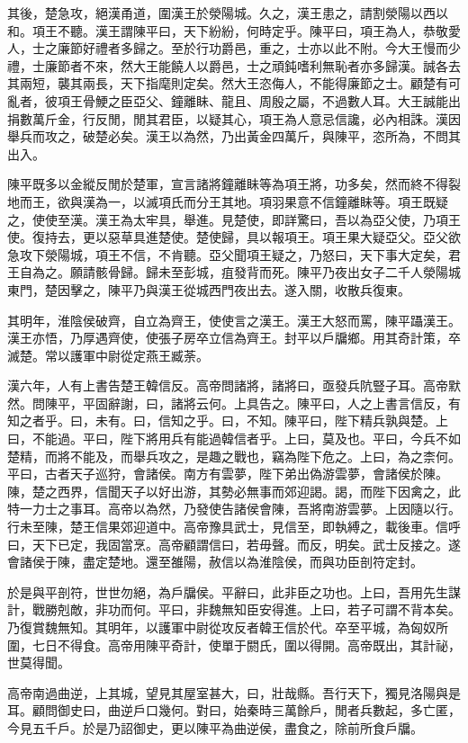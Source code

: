 其後，楚急攻，絕漢甬道，圍漢王於滎陽城。久之，漢王患之，請割滎陽以西以和。項王不聽。漢王謂陳平曰，天下紛紛，何時定乎。陳平曰，項王為人，恭敬愛人，士之廉節好禮者多歸之。至於行功爵邑，重之，士亦以此不附。今大王慢而少禮，士廉節者不來，然大王能饒人以爵邑，士之頑鈍嗜利無恥者亦多歸漢。誠各去其兩短，襲其兩長，天下指麾則定矣。然大王恣侮人，不能得廉節之士。顧楚有可亂者，彼項王骨鯁之臣亞父、鐘離眛、龍且、周殷之屬，不過數人耳。大王誠能出捐數萬斤金，行反閒，閒其君臣，以疑其心，項王為人意忌信讒，必內相誅。漢因舉兵而攻之，破楚必矣。漢王以為然，乃出黃金四萬斤，與陳平，恣所為，不問其出入。

陳平既多以金縱反閒於楚軍，宣言諸將鐘離眛等為項王將，功多矣，然而終不得裂地而王，欲與漢為一，以滅項氏而分王其地。項羽果意不信鐘離眛等。項王既疑之，使使至漢。漢王為太牢具，舉進。見楚使，即詳驚曰，吾以為亞父使，乃項王使。復持去，更以惡草具進楚使。楚使歸，具以報項王。項王果大疑亞父。亞父欲急攻下滎陽城，項王不信，不肯聽。亞父聞項王疑之，乃怒曰，天下事大定矣，君王自為之。願請骸骨歸。歸未至彭城，疽發背而死。陳平乃夜出女子二千人滎陽城東門，楚因擊之，陳平乃與漢王從城西門夜出去。遂入關，收散兵復東。

其明年，淮陰侯破齊，自立為齊王，使使言之漢王。漢王大怒而罵，陳平躡漢王。漢王亦悟，乃厚遇齊使，使張子房卒立信為齊王。封平以戶牖鄉。用其奇計策，卒滅楚。常以護軍中尉從定燕王臧荼。

漢六年，人有上書告楚王韓信反。高帝問諸將，諸將曰，亟發兵阬豎子耳。高帝默然。問陳平，平固辭謝，曰，諸將云何。上具告之。陳平曰，人之上書言信反，有知之者乎。曰，未有。曰，信知之乎。曰，不知。陳平曰，陛下精兵孰與楚。上曰，不能過。平曰，陛下將用兵有能過韓信者乎。上曰，莫及也。平曰，今兵不如楚精，而將不能及，而舉兵攻之，是趣之戰也，竊為陛下危之。上曰，為之柰何。平曰，古者天子巡狩，會諸侯。南方有雲夢，陛下弟出偽游雲夢，會諸侯於陳。陳，楚之西界，信聞天子以好出游，其勢必無事而郊迎謁。謁，而陛下因禽之，此特一力士之事耳。高帝以為然，乃發使告諸侯會陳，吾將南游雲夢。上因隨以行。行未至陳，楚王信果郊迎道中。高帝豫具武士，見信至，即執縛之，載後車。信呼曰，天下已定，我固當烹。高帝顧謂信曰，若毋聲。而反，明矣。武士反接之。遂會諸侯于陳，盡定楚地。還至雒陽，赦信以為淮陰侯，而與功臣剖符定封。

於是與平剖符，世世勿絕，為戶牖侯。平辭曰，此非臣之功也。上曰，吾用先生謀計，戰勝剋敵，非功而何。平曰，非魏無知臣安得進。上曰，若子可謂不背本矣。乃復賞魏無知。其明年，以護軍中尉從攻反者韓王信於代。卒至平城，為匈奴所圍，七日不得食。高帝用陳平奇計，使單于閼氏，圍以得開。高帝既出，其計祕，世莫得聞。

高帝南過曲逆，上其城，望見其屋室甚大，曰，壯哉縣。吾行天下，獨見洛陽與是耳。顧問御史曰，曲逆戶口幾何。對曰，始秦時三萬餘戶，閒者兵數起，多亡匿，今見五千戶。於是乃詔御史，更以陳平為曲逆侯，盡食之，除前所食戶牖。

